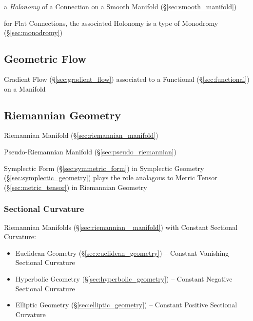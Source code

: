 a \emph{Holonomy} of a Connection on a Smooth Manifold
(\S\ref{sec:smooth_manifold})

for Flat Connections, the associated Holonomy is a type of Monodromy
(\S\ref{sec:monodromy})



\subsection{Geometric Flow}\label{sec:geometric_flow}

Gradient Flow (\S\ref{sec:gradient_flow}) associated to a Functional
(\S\ref{sec:functional}) on a Manifold



\subsection{Riemannian Geometry}\label{sec:riemannian_geometry}

Riemannian Manifold (\S\ref{sec:riemannian_manifold})

Pseudo-Riemannian Manifold (\S\ref{sec:pseudo_riemannian})

Symplectic Form (\S\ref{sec:symmetric_form}) in Symplectic Geometry
(\S\ref{sec:symplectic_geometry}) plays the role analagous to Metric Tensor
(\S\ref{sec:metric_tensor}) in Riemannian Geometry



\subsubsection{Sectional Curvature}\label{sec:sectional_curvature}


Riemannian Manifolds (\S\ref{sec:riemannian _manifold}) with Constant Sectional
Curvature:
\begin{itemize}
  \item Euclidean Geometry (\S\ref{sec:euclidean_geometry}) -- Constant
    Vanishing Sectional Curvature
  \item Hyperbolic Geometry (\S\ref{sec:hyperbolic_geometry}) -- Constant
    Negative Sectional Curvature
  \item Elliptic Geometry (\S\ref{sec:elliptic_geometry}) -- Constant Positive
    Sectional Curvature
\end{itemize}



